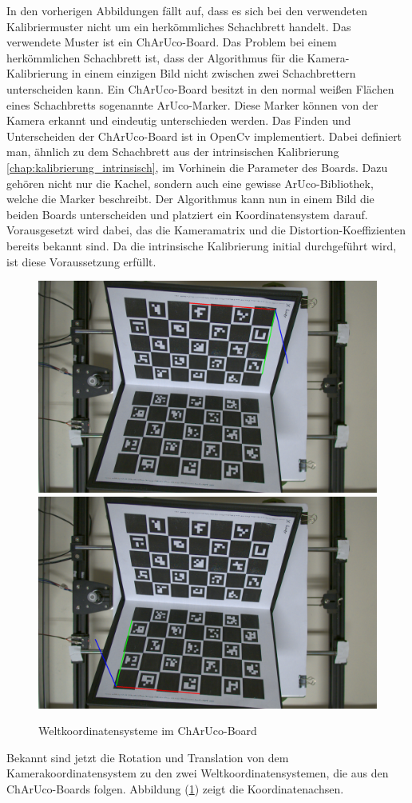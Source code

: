 		In den vorherigen Abbildungen fällt auf, dass es sich bei den verwendeten Kalibriermuster nicht um ein herkömmliches Schachbrett handelt. Das verwendete Muster ist ein ChArUco-Board. Das Problem bei einem herkömmlichen Schachbrett ist, dass der Algorithmus für die Kamera-Kalibrierung in einem einzigen Bild nicht zwischen zwei Schachbrettern unterscheiden kann. Ein ChArUco-Board besitzt in den normal weißen Flächen eines Schachbretts sogenannte ArUco-Marker. Diese Marker können von der Kamera erkannt und eindeutig unterschieden werden. Das Finden und Unterscheiden der ChArUco-Board ist in OpenCv implementiert. Dabei definiert man, ähnlich zu dem Schachbrett aus der intrinsischen Kalibrierung \ref{chap:kalibrierung_intrinsisch}, im Vorhinein die Parameter des Boards. Dazu gehören nicht nur die Kachel, sondern auch eine gewisse ArUco-Bibliothek, welche die Marker beschreibt. Der Algorithmus kann nun in einem Bild die beiden Boards unterscheiden und platziert ein Koordinatensystem darauf. Vorausgesetzt wird dabei, das die Kameramatrix und die Distortion-Koeffizienten bereits bekannt sind. Da die intrinsische Kalibrierung initial durchgeführt wird, ist diese Voraussetzung erfüllt.  
		
		\begin{figure}[h]
			\centering
			\includegraphics[width=0.49\linewidth]{img/hauptteil/ext-calib/charuco_primary.png}
			\includegraphics[width=0.49\linewidth]{img/hauptteil/ext-calib/charuco_secondary.png}
			\caption{Weltkoordinatensysteme im ChArUco-Board}
			\label{fig:ext-calib-poses}
		\end{figure}
	
		Bekannt sind jetzt die Rotation und Translation von dem Kamerakoordinatensystem zu den zwei Weltkoordinatensystemen, die aus den ChArUco-Boards folgen. Abbildung (\ref{fig:ext-calib-poses}) zeigt die Koordinatenachsen. 
		
